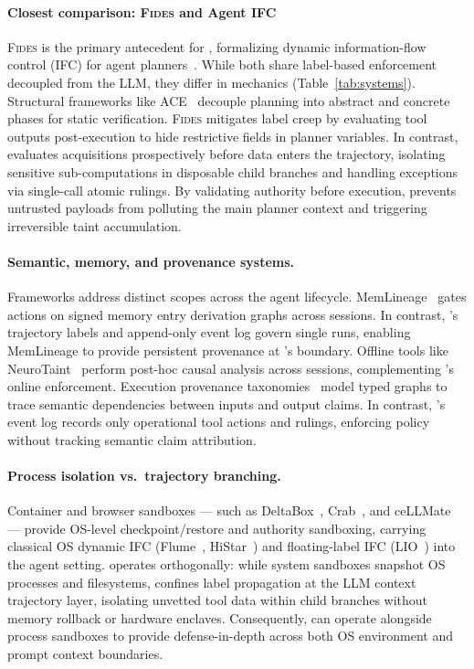 \paragraph{Closest comparison: \textsc{Fides} and Agent IFC}
\textsc{Fides} is the primary antecedent for \appa{}, formalizing dynamic information-flow control (IFC) for agent planners~\cite{fides}. While both share label-based enforcement decoupled from the LLM, they differ in mechanics (Table~\ref{tab:systems}). Structural frameworks like ACE~\cite{li2026ace} decouple planning into abstract and concrete phases for static verification. \textsc{Fides} mitigates label creep by evaluating tool outputs post-execution to hide restrictive fields in planner variables. In contrast, \appa{} evaluates acquisitions prospectively before data enters the trajectory, isolating sensitive sub-computations in disposable child branches and handling exceptions via single-call atomic rulings. By validating authority before execution, \appa{} prevents untrusted payloads from polluting the main planner context and triggering irreversible taint accumulation.

\paragraph{Semantic, memory, and provenance systems.}
Frameworks address distinct scopes across the agent lifecycle. MemLineage~\cite{ouyangMemLineageLineageGuidedEnforcement2026} gates actions on signed memory entry derivation graphs across sessions. In contrast, \appa{}'s trajectory labels and append-only event log govern single runs, enabling MemLineage to provide persistent provenance at \appa{}'s boundary. Offline tools like NeuroTaint~\cite{caiGhostAgentRedefining2026} perform post-hoc causal analysis across sessions, complementing \appa{}'s online enforcement. Execution provenance taxonomies~\cite{wangAgentTracesTrust2026} model typed graphs to trace semantic dependencies between inputs and output claims. In contrast, \appa{}'s event log records only operational tool actions and rulings, enforcing policy without tracking semantic claim attribution.

\paragraph{Process isolation vs.\ trajectory branching.}
Container and browser sandboxes — such as DeltaBox~\cite{dong2026deltabox}, Crab~\cite{wu2026crab}, and ceLLMate~\cite{meng2025cellmate} — provide OS-level checkpoint/restore and authority sandboxing, carrying classical OS dynamic IFC (Flume~\cite{krohn2007information}, HiStar~\cite{zeldovich2006making}) and floating-label IFC (LIO~\cite{stefan2011flexible}) into the agent setting. \appa{} operates orthogonally: while system sandboxes snapshot OS processes and filesystems, \appa{} confines label propagation at the LLM context trajectory layer, isolating unvetted tool data within child branches without memory rollback or hardware enclaves. Consequently, \appa{} can operate alongside process sandboxes to provide defense-in-depth across both OS environment and prompt context boundaries.

